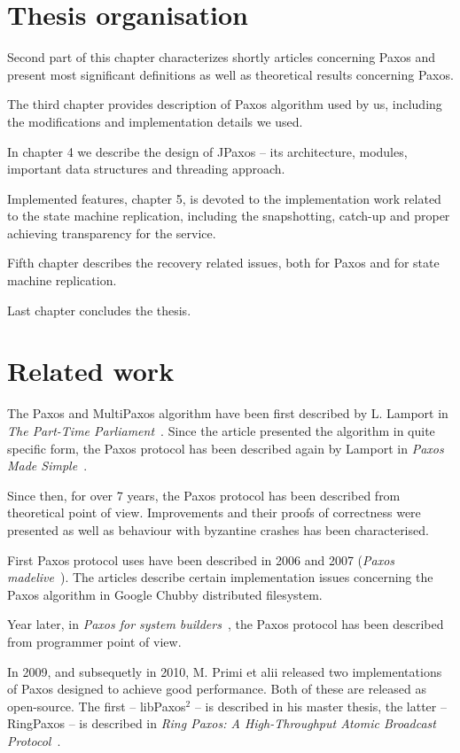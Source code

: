 \section{Thesis organisation}
Second part of this chapter characterizes shortly articles concerning Paxos and present most significant definitions as well as theoretical results concerning Paxos.

The third chapter provides description of Paxos algorithm used by us, including the modifications and implementation details we used.

In chapter 4 we describe the design of JPaxos -- its architecture, modules, important data structures and threading approach.

Implemented features, chapter 5, is devoted to the implementation work related to the state machine replication, including the snapshotting, catch-up and proper achieving transparency for the service.

Fifth chapter describes the recovery related issues, both for Paxos and for state machine replication.

Last chapter concludes the thesis. %

\section{Related work}

The Paxos and MultiPaxos algorithm have been first described by L. Lamport in \textit{The Part-Time Parliament}~\cite{Lam98}. Since the article presented the algorithm in quite specific form, the Paxos protocol has been described again by Lamport in \textit{Paxos Made Simple}~\cite{Lam01}.

Since then, for over 7 years, the Paxos protocol has been described from theoretical point of view. Improvements and their proofs of correctness were presented as well as behaviour with byzantine crashes has been characterised.

First Paxos protocol uses have been described in 2006 and 2007 (\textit{Paxos made\linebreak live}~\cite{CGR07}). The articles describe certain implementation issues concerning the Paxos algorithm in Google Chubby distributed filesystem.

Year later, in \textit{Paxos for system builders}~\cite{AK08}, the Paxos protocol has been described from programmer point of view.

In 2009, and subsequetly in 2010, M. Primi et alii released two implementations of Paxos designed to achieve good performance. Both of these are released as open-source. The first -- libPaxos$^2$ -- is described in his master thesis, the latter -- RingPaxos -- is described in \textit{Ring Paxos: A High-Throughput Atomic Broadcast Protocol}~\cite{Mar10}.

